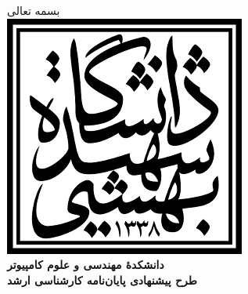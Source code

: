 \documentclass[letterpaper,11pt]{article}
\begin{document}
\begin{center}
\footnotesize{بسمه تعالی} \\ \vspace{20pt}
\includegraphics[scale=0.4]{assets/logo.png} \\
\footnotesize{\textbf{دانشکدهٔ مهندسی و علوم کامپیوتر}}\\ \vspace{10pt}
{\LARGE \textbf{طرح پیشنهادی پایان‌نامه کارشناسی ارشد}} \\
\end{center}
\end{document}
